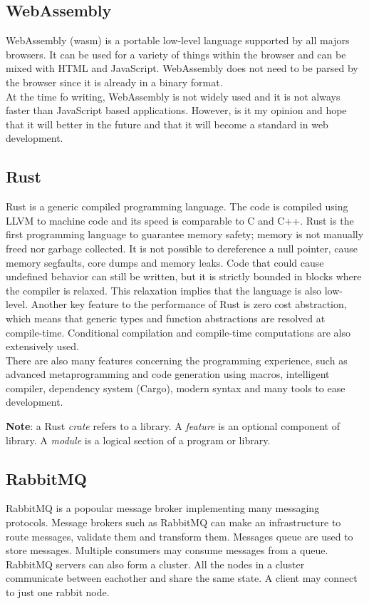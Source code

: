 \documentclass[../documentation.tex]{subfiles}
\begin{document}
\subsection{WebAssembly}

WebAssembly (wasm) is a portable low-level language supported by all majors browsers.
It can be used for a variety of things within the browser and can be mixed
with HTML and JavaScript.
WebAssembly does not need to be parsed by the browser since it is already
in a binary format. \\
At the time fo writing, WebAssembly is not widely used
and it is not always faster than JavaScript based applications.
However, is it my opinion and hope that it will
better in the future and that it will become a standard in
web development.

\subsection{Rust}

Rust is a generic compiled programming language.
The code is compiled using LLVM to machine code and its speed
is comparable to C and C++.
Rust is the first programming language to guarantee memory safety;
memory is not manually freed nor garbage collected.
It is not possible to dereference a null pointer, cause memory segfaults, core dumps
and memory leaks.
Code that could cause undefined behavior can still be written,
but it is strictly bounded in blocks where the compiler is relaxed.
This relaxation implies that the language is also low-level.
Another key feature to the performance of Rust is zero cost abstraction,
which means that generic types and function abstractions are resolved at compile-time.
Conditional compilation and compile-time computations are also extensively used.
\\
There are also many features concerning the programming experience, such as
advanced metaprogramming and code generation using macros, intelligent compiler,
dependency system (Cargo), modern syntax and many tools to ease development.

\textbf{\color{red} Note}: a Rust \textit{crate} refers to a library.
A \textit{feature} is an optional component of library.
A \textit{module} is a logical section of a program or library.

\subsection{RabbitMQ}

RabbitMQ is a popoular message broker implementing many messaging protocols.
Message brokers such as RabbitMQ can make an infrastructure to route messages,
validate them and transform them. Messages queue are used
to store messages. Multiple consumers may consume messages from a queue. \\
RabbitMQ servers can also form a cluster.
All the nodes in a cluster communicate between eachother and share the same
state. A client may connect to just one rabbit node.
\end{document}
